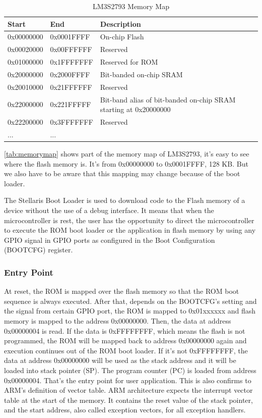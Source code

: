 \begin{center}
	\begin{table}
		\begin{tabular}{|p{1.6cm} p{1.6cm} p{4cm}|} 
			\hline
			Start & End & Description \\ [0.5ex] 
			\hline
			0x00000000 & 0x0001FFFF & On-chip Flash \\ 
			\hline
			0x00020000 & 0x00FFFFFF & Reserved \\
			\hline
			0x01000000 & 0x1FFFFFFF & Reserved for ROM \\
			\hline
			0x20000000 & 0x2000FFFF & Bit-banded on-chip SRAM \\
			\hline
			0x20010000 & 0x21FFFFFF & Reserved \\
			\hline
			0x22000000 & 0x221FFFFF & Bit-band alias of bit-banded on-chip SRAM starting at 0x20000000 \\
			\hline
			0x22200000 & 0x3FFFFFFF & Reserved \\
			\hline
			... & ... &   \\ 
			\hline
		\end{tabular}
		\caption{LM3S2793 Memory Map}
		\label{tab:memorymap}
	\end{table}
\end{center}

\autoref{tab:memorymap} shows part of the memory map of LM3S2793, it's easy to see where the flash memory is. It's from 0x00000000 to 0x0001FFFF, 128 KB. But we also have to be aware that this mapping may change because of the boot loader.

The Stellaris Boot Loader is used to download code to the Flash memory of a device without the use of a debug interface. It means that when the microcontroller is rest, the user has the opportunity to direct the microcontroller to execute the ROM boot loader or the application in flash memory by using any GPIO signal in GPIO ports as configured in the Boot Configuration (BOOTCFG) register.


\subsubsection{Entry Point}
At reset, the ROM is mapped over the flash memory so that the ROM boot sequence is always executed. After that, depends on the BOOTCFG's setting and the signal from certain GPIO port, the ROM is mapped to 0x01xxxxxx and flash memory is mapped to the address 0x00000000. Then, the data at address 0x00000004 is read. If the data is 0xFFFFFFFF, which means the flash is not programmed, the ROM will be mapped back to address 0x00000000 again and execution continues out of the ROM boot loader. If it's not 0xFFFFFFFF, the data at address 0x00000000 will be used as the stack address and it will be loaded into stack pointer (SP). The program counter (PC) is loaded from address 0x00000004. That's the entry point for user application. This is also confirms to ARM's definition of vector table. ARM architecture expects the interrupt vector table at the start of the memory. It contains the reset value of the stack pointer, and the start address, also called exception vectors, for all exception handlers.  

